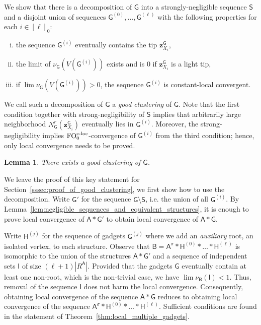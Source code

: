 \documentclass[11pt]{article}
\theoremstyle{plain}
\newtheorem{lemma}[theorem]{Lemma}
\theoremstyle{definition}
\theoremstyle{remark}
\DeclareMathOperator\FO{FO}
\newcommand{\FOcloc}[1]{\FO_{#1}^{\textnormal{c-loc}}}
\newcommand{\strseq}[1]{{\boldsymbol{\mathsf{#1}}}}
\newcommand{\seq}[1]{{\mathsf{#1}}}
\newcommand{\tpl}[1]{{\bm{#1}}}
\begin{document}
We show that there is a decomposition of $\strseq{G}$ into a strongly-negligible sequence $\seq{S}$ and a disjoint union of sequences $\strseq{G}^{(0)}, \dots, \strseq{G}^{(\ell)}$ with the following properties for each $i \in [\ell]_0$:
\begin{enumerate}[(i)]
    \item the sequence $\strseq{G}^{(i)}$ eventually contains the tip $\tpl{z}^\strseq{G}_{X_i}$,
    \item the limit of $\nu_\strseq{G}(V(\strseq{G}^{(i)}))$ exists and is $0$ if $\tpl{z}^\strseq{G}_{X_i}$ is a light tip,
    \item if $\lim \nu_\strseq{G}(V(\strseq{G}^{(i)})) > 0$, the sequence $\strseq{G}^{(i)}$ is constant-local convergent.
\end{enumerate}
We call such a decomposition of $\strseq{G}$ a \emph{good clustering} of $\strseq{G}$.
Note that the first condition together with strong-negligibility of $\seq{S}$ implies that arbitrarily large neighborhood $N^r_\strseq{G}(\tpl{z}^\strseq{G}_{X_i})$ eventually lies in $\strseq{G}^{(i)}$.
Moreover, the strong-negligibility implies $\FOcloc{0}$-convergence of $\strseq{G}^{(i)}$ from the third condition; hence, only local convergence needs to be proved.

\begin{lemma}\label{lem:existence_of_good_clustering}
    There exists a good clustering of $\strseq{G}$.
\end{lemma}

We leave the proof of this key statement for Section~\ref{sssec:proof_of_good_clustering}, we first show how to use the decomposition.
Write $\strseq{G}'$ for the sequence $\strseq{G} \setminus \seq{S}$, i.e. the union of all $\strseq{G}^{(i)}$.
By Lemma~\ref{lem:negligible_sequences_and_equivalent_structures}, it is enough to prove local convergence of $\strseq{A}*\strseq{G}'$ to obtain local convergence of $\strseq{A}*\strseq{G}$.

Write $\strseq{H}^{(j)}$ for the sequence of gadgets $\strseq{G}^{(j)}$ where we add an \emph{auxiliary} root, an isolated vertex, to each structure.
Observe that $\strseq{B} = \strseq{A}^\sigma*\strseq{H}^{(0)}*\dots*\strseq{H}^{(\ell)}$ is isomorphic to the union of the structures $\strseq{A}*\strseq{G}'$ and a sequence of independent sets $\seq{I}$ of size $(\ell+1)|R^\strseq{A}|$.
Provided that the gadgets $\strseq{G}$ eventually contain at least one non-root, which is the non-trivial case, we have $\lim \nu_\strseq{B}(\seq{I}) < 1$.
Thus, removal of the sequence $\seq{I}$ does not harm the local convergence.
Consequently, obtaining local convergence of the sequence $\strseq{A}*\strseq{G}$ reduces to obtaining local convergence of the sequence $\strseq{A}^\sigma*\strseq{H}^{(0)}*\dots*\strseq{H}^{(\ell)}$.
Sufficient conditions are found in the statement of Theorem~\ref{thm:local_multiple_gadgets}.
\end{document}
